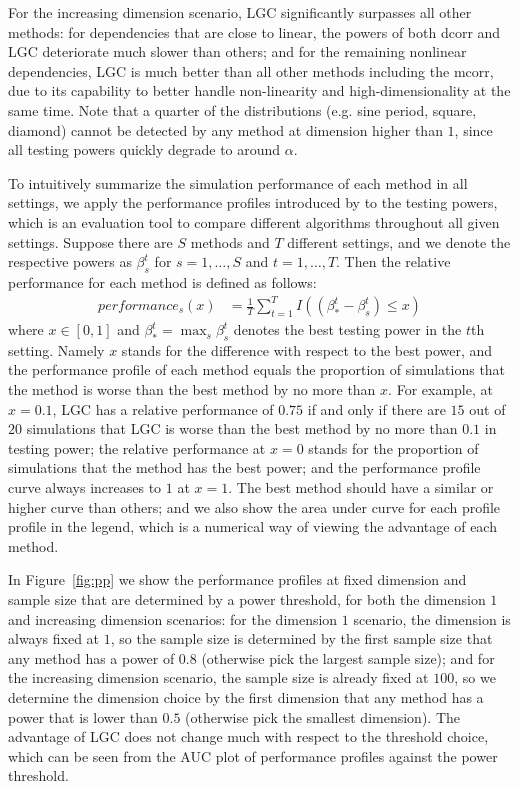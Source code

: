 \documentclass[11pt]{article}
\begin{document}
For the increasing dimension scenario, LGC significantly surpasses all other methods: for dependencies that are close to linear, the powers of both dcorr and LGC deteriorate much slower than others; and for the remaining nonlinear dependencies, LGC is much better than all other methods including the mcorr, due to its capability to better handle non-linearity and high-dimensionality at the same time. Note that a quarter of the distributions (e.g. sine period, square, diamond) cannot be detected by any method at dimension higher than $1$, since all testing powers quickly degrade to around $\alpha$.

To intuitively summarize the simulation performance of each method in all settings, we apply the performance profiles introduced by \cite{DolanMore2002} to the testing powers, which is an evaluation tool to compare different algorithms throughout all given settings. Suppose there are $S$ methods and $T$ different settings, and we denote the respective powers as $\beta_{s}^{t}$ for $s=1,\ldots,S$ and $t=1,\ldots,T$. Then the relative performance for each method is defined as follows:
\begin{align*}
performance_{s}(x) &= \frac{1}{T} \sum_{t=1}^{T} I((\beta_{*}^{t}-\beta_{s}^{t}) \leq x)
\end{align*}
where $x \in [0,1]$ and $\beta_{*}^{t} =\max_{s} \beta_{s}^{t}$ denotes the best testing power in the $t$th setting. Namely $x$ stands for the difference with respect to the best power, and the performance profile of each method equals the proportion of simulations that the method is worse than the best method by no more than $x$. For example, at $x=0.1$, LGC has a relative performance of $0.75$ if and only if there are $15$ out of $20$ simulations that LGC is worse than the best method by no more than $0.1$ in testing power; the relative performance at $x=0$ stands for the proportion of simulations that the method has the best power; and the performance profile curve always increases to $1$ at $x=1$. The best method should have a similar or higher curve than others; and we also show the area under curve for each profile profile in the legend, which is a numerical way of viewing the advantage of each method.

In Figure~\ref{fig:pp} we show the performance profiles at fixed dimension and sample size that are determined by a power threshold, for both the dimension $1$ and increasing dimension scenarios: for the dimension $1$ scenario, the dimension is always fixed at $1$, so the sample size is determined by the first sample size that any method has a power of $0.8$ (otherwise pick the largest sample size); and for the increasing dimension scenario, the sample size is already fixed at $100$, so we determine the dimension choice by the first dimension that any method has a power that is lower than $0.5$ (otherwise pick the smallest dimension). The advantage of LGC does not change much with respect to the threshold choice, which can be seen from the AUC plot of performance profiles against the power threshold.
\end{document}
